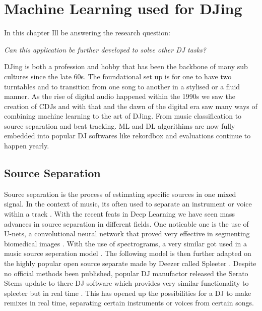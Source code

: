 
\graphicspath{{Chapter3/}}

\chapter{Machine Learning used for DJing}

In this chapter Ill be answering the research question:

\textit{Can this application be further developed to solve other DJ tasks?} 

DJing is both a profession and hobby that has been the backbone of many sub cultures since the late 60s. The foundational set up is for one to have two turntables and to transition from one song to another in a stylised or a fluid manner. As the rise of digital audio happened within the 1990s we saw the creation of CDJs and with that and the dawn of the digital era saw many ways of combining machine learning to the art of DJing. From music classification to source separation and beat tracking. ML and DL algorithims are now fully embedded into popular DJ softwares like rekordbox and evaluations continue to happen yearly. 

\section{Source Separation}

Source separation is the process of estimating specific sources in one mixed signal. In the context of music, its often used to separate an instrument or voice within a track \citep{sgouros_efficient_2022}. With the recent feats in Deep Learning we have seen mass advances in source separation in different fields. One noticable one is the use of U-nets, a convolutional neural network that proved very effective in segmenting biomedical images \citep{ronneberger_u-net_2015}. With the use of spectrograms, a very similar got used in a music source seperation model \citep{jansson_singing_2017}. The following model is then further adapted on the highly popular open source separate made by Deezer called Spleeter \citep{hennequin_spleeter_2020}. Despite no official methods been published, popular DJ manufactor released the Serato Stems update to there DJ software which provides very similar functionality to spleeter but in real time \citep{kirn_review_2023}. This has opened up the possibilities for a DJ to make remixes in real time, separating certain instruments or voices from certain songs.


